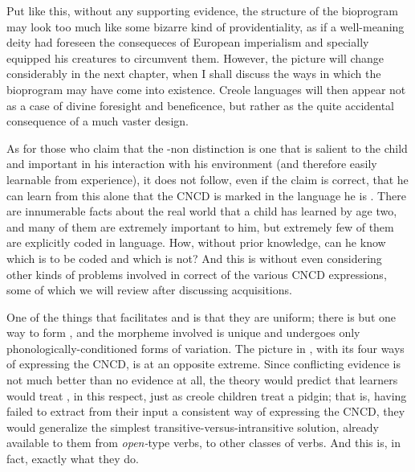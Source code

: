 Put like this, without any supporting evidence, the structure of the bioprogram may look too much like some bizarre kind of providentiality, as if a well-meaning deity had foreseen the consequeces of European imperialism and specially equipped his creatures to circum\-vent them. However, the picture will change considerably in the next chapter, when I shall discuss the ways in which the bioprogram may have come into existence. Creole languages will then appear not as a case of divine foresight and beneficence, but rather as the quite acci\-dental consequence of a much vaster design.

As for those who claim that the -non distinc\-tion is one that is salient to the child and important in his interaction with his environment (and therefore easily learnable from experience), it does not follow, even if the claim is correct, that he can learn from this alone that the CNCD is marked in the language he is . There are innumerable facts about the real world that a child has learned by age two, and many of them are extremely important to him, but extremely few of them are explicitly coded in language. How, without prior knowledge, can he know which is to be coded and which is not? And this is without even considering other kinds of problems involved in correct  of the various CNCD expressions, some of which we will review after discussing  acquisitions.

One of the things that facilitates   and   is that they are uniform; there is but one way to form , and the morpheme involved is unique and undergoes only phonologically-conditioned forms of variation. The picture in , with its four ways of expressing the CNCD, is at an opposite extreme. Since conflicting evidence is not much better than no evidence at all, the theory would predict that  learners would treat , in this respect, just as creole children treat a pidgin; that is, having failed to extract from their input a consistent way of expressing the CNCD, they would generalize the simplest transitive-versus-intransitive solution, already available to them from \textit{open-}type verbs, to other classes of verbs. And this is, in fact, exactly what they do.

